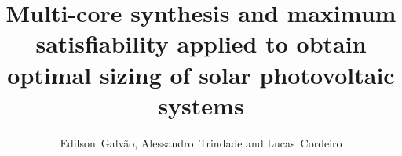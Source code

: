 \documentclass[journal,onecolumn]{IEEEtran}
\begin{document}
%
\title{Multi-core synthesis and maximum satisfiability applied to obtain optimal sizing of solar photovoltaic systems}
%
%
%

\author{Edilson~Galvão, Alessandro~Trindade and Lucas~Cordeiro}%

% 
%
\end{document}
